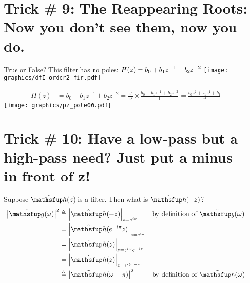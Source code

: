 \section*{Trick \# 9: The Reappearing Roots: Now you don't see them, now you do.}
\vfill
True or False? This filter has no poles:
\vfill
  $\displaystyle H(z)= b_0 + b_1 z^{-1} + b_2 z^{-2}$
\vfill
\texttt{[image: graphics/dfI\_order2\_fir.pdf]}

\vfill\mbox{}\newpage
\begin{align*}
  H(z)
    &= b_0 + b_1 z^{-1} + b_2 z^{-2}
     = \frac{z^2}{z^2} \times \frac{b_0 + b_1 z^{-1} + b_2 z^{-2}}{1}
     = \frac{b_0 z^2 + b_1 z^{1} + b_2 }{z^2}
\end{align*}
\vfill
\texttt{[image: graphics/pz\_pole00.pdf]}


\vfill\mbox{}
\newpage
\section*{Trick \# 10: Have a low-pass but a high-pass need? Just put a minus in front of z!}
\vfill
Suppose $\Zh(z)$ is a  filter. \qquad Then what is  $\Zh(-z)$?
\vfill
{\begin{align*}
  \abs{\Fg(\omega)}^2
    &\eqd \abs{\Zh(-z)}_{z=e^{i\omega}}
    && \text{by definition of $\Fg(\omega)$}
  \\&= \abs{\Zh(e^{-i\pi}z)}_{z=e^{i\omega}}
  \\&= \abs{\Zh(z)}_{z=e^{i\omega}e^{-i\pi}}
  \\&= \abs{\Zh(z)}_{z=e^{i(\omega-\pi)}}
  \\&\eqd \abs{\Fh(\omega-\pi)}^2
    && \text{by definition of $\Fh(\omega)$}
\end{align*}}




\vfill\mbox{}
